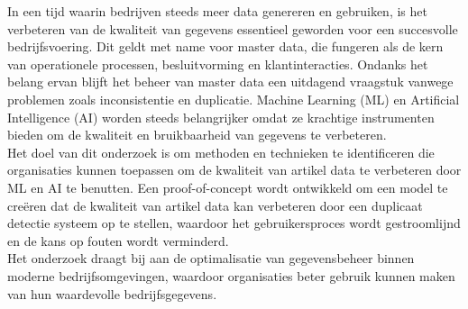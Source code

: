 In een tijd waarin bedrijven steeds meer data genereren en gebruiken, is het verbeteren van de kwaliteit van gegevens essentieel geworden voor een succesvolle bedrijfsvoering. Dit geldt met name voor master data, die fungeren als de kern van operationele processen, besluitvorming en klantinteracties. Ondanks het belang ervan blijft het beheer van master data een uitdagend vraagstuk vanwege problemen zoals inconsistentie en duplicatie. Machine Learning (ML) en Artificial Intelligence (AI) worden steeds belangrijker omdat ze krachtige instrumenten bieden om de kwaliteit en bruikbaarheid van gegevens te verbeteren.
\\
Het doel van dit onderzoek is om methoden en technieken te identificeren die organisaties kunnen toepassen om de kwaliteit van artikel data te verbeteren door ML en AI te benutten. Een proof-of-concept wordt ontwikkeld om een model te creëren dat de kwaliteit van artikel data kan verbeteren door een duplicaat detectie systeem op te stellen, waardoor het gebruikersproces wordt gestroomlijnd en de kans op fouten wordt verminderd. 
\\
Het onderzoek draagt bij aan de optimalisatie van gegevensbeheer binnen moderne bedrijfsomgevingen, waardoor organisaties beter gebruik kunnen maken van hun waardevolle bedrijfsgegevens.

